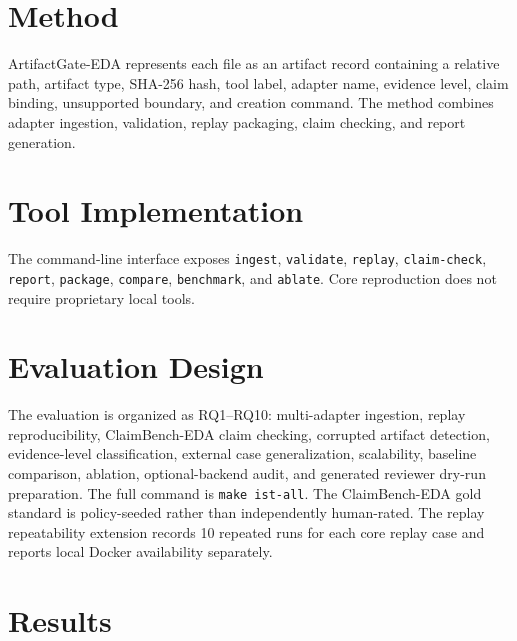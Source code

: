 \documentclass[preprint,12pt]{elsarticle}
\begin{document}
\section{Method}

ArtifactGate-EDA represents each file as an artifact record containing a
relative path, artifact type, SHA-256 hash, tool label, adapter name, evidence
level, claim binding, unsupported boundary, and creation command. The method
combines adapter ingestion, validation, replay packaging, claim checking, and
report generation.

\section{Tool Implementation}

The command-line interface exposes \texttt{ingest}, \texttt{validate},
\texttt{replay}, \texttt{claim-check}, \texttt{report}, \texttt{package},
\texttt{compare}, \texttt{benchmark}, and \texttt{ablate}. Core reproduction
does not require proprietary local tools.

\section{Evaluation Design}

The evaluation is organized as RQ1--RQ10: multi-adapter ingestion, replay
reproducibility, ClaimBench-EDA claim checking, corrupted artifact detection,
evidence-level classification, external case generalization, scalability,
baseline comparison, ablation, optional-backend audit, and generated reviewer
dry-run preparation. The full command is \texttt{make ist-all}. The
ClaimBench-EDA gold standard is policy-seeded rather than independently
human-rated. The replay repeatability extension records 10 repeated runs for
each core replay case and reports local Docker availability separately.

\section{Results}
\end{document}

